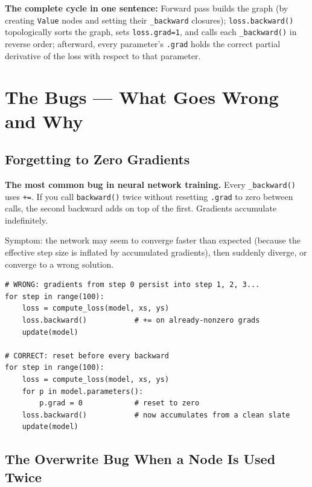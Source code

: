 \documentclass[12pt,a4paper]{article}
\newcommand{\code}[1]{\texttt{\small\color{deepblue}#1}}
\begin{document}
\begin{stickybox}
\textbf{The complete cycle in one sentence:}
Forward pass builds the graph (by creating \code{Value} nodes and setting their \code{\_backward} closures); \code{loss.backward()} topologically sorts the graph, sets \code{loss.grad=1}, and calls each \code{\_backward()} in reverse order; afterward, every parameter's \code{.grad} holds the correct partial derivative of the loss with respect to that parameter.
\end{stickybox}

\section{The Bugs — What Goes Wrong and Why}

\subsection{Forgetting to Zero Gradients}

\begin{dangerbox}
\textbf{The most common bug in neural network training.} Every \code{\_backward()} uses \code{+=}. If you call \code{backward()} twice without resetting \code{.grad} to zero between calls, the second backward adds on top of the first. Gradients accumulate indefinitely.

Symptom: the network may seem to converge faster than expected (because the effective step size is inflated by accumulated gradients), then suddenly diverge, or converge to a wrong solution.
\end{dangerbox}

\begin{lstlisting}
# WRONG: gradients from step 0 persist into step 1, 2, 3...
for step in range(100):
    loss = compute_loss(model, xs, ys)
    loss.backward()           # += on already-nonzero grads
    update(model)

# CORRECT: reset before every backward
for step in range(100):
    loss = compute_loss(model, xs, ys)
    for p in model.parameters():
        p.grad = 0            # reset to zero
    loss.backward()           # now accumulates from a clean slate
    update(model)
\end{lstlisting}

\subsection{The Overwrite Bug When a Node Is Used Twice}
\end{document}
